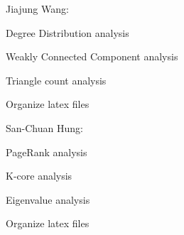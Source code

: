 \begin{itemize*}
\item
Jiajung Wang: 

\begin{itemize*}
\item
Degree Distribution analysis
\item
Weakly Connected Component analysis
\item
Triangle count analysis
\item
Organize latex files
\end{itemize*}

\item
San-Chuan Hung: 

\begin{itemize*}
\item 
PageRank analysis
\item 
K-core analysis
\item
Eigenvalue analysis
\item
Organize latex files
\end{itemize*}
\end{itemize*}
